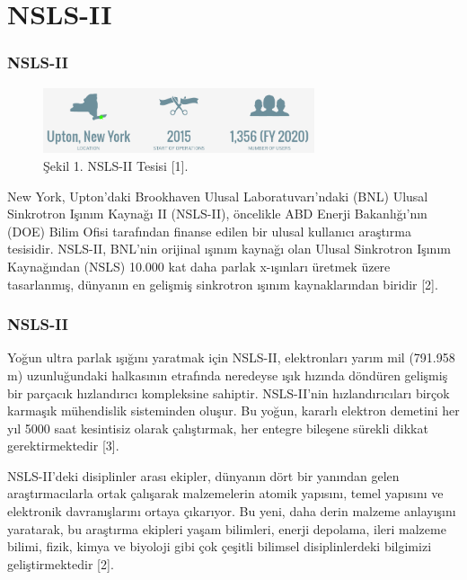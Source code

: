 \documentclass[aspectratio=169,10pt]{beamer}
\begin{document}
	
    \section{NSLS-II}

    \begin{frame}[allowframebreaks]
\frametitle{NSLS-II}

\begin{figure}[h!]
 \centering
\includegraphics[width=8cm]{ssözet.png}
\caption*{Şekil 1. NSLS-II Tesisi [1].}
	\end{figure}

New York, Upton'daki Brookhaven Ulusal Laboratuvarı'ndaki (BNL) Ulusal Sinkrotron Işınım Kaynağı II (NSLS-II), öncelikle ABD Enerji Bakanlığı'nın (DOE) Bilim Ofisi tarafından finanse edilen bir ulusal kullanıcı araştırma tesisidir. NSLS-II, BNL'nin orijinal ışınım kaynağı olan Ulusal Sinkrotron Işınım Kaynağından (NSLS) 10.000 kat daha parlak x-ışınları üretmek üzere tasarlanmış, dünyanın en gelişmiş sinkrotron ışınım kaynaklarından biridir [2].



\end{frame}

  \begin{frame}[allowframebreaks]
  \frametitle{NSLS-II}
 
Yoğun ultra parlak ışığını yaratmak için NSLS-II, elektronları yarım mil (791.958 m) uzunluğundaki halkasının etrafında neredeyse ışık hızında döndüren gelişmiş bir parçacık hızlandırıcı kompleksine sahiptir. NSLS-II'nin hızlandırıcıları birçok karmaşık mühendislik sisteminden oluşur. Bu yoğun, kararlı elektron demetini her yıl 5000 saat kesintisiz olarak çalıştırmak, her entegre bileşene sürekli dikkat gerektirmektedir [3].

NSLS-II'deki disiplinler arası ekipler, dünyanın dört bir yanından gelen araştırmacılarla ortak çalışarak malzemelerin atomik yapısını, temel yapısını ve elektronik davranışlarını ortaya çıkarıyor. Bu yeni, daha derin malzeme anlayışını yaratarak, bu araştırma ekipleri yaşam bilimleri, enerji depolama, ileri malzeme bilimi, fizik, kimya ve biyoloji gibi çok çeşitli bilimsel disiplinlerdeki bilgimizi geliştirmektedir [2].


\end{frame}
\end{document}
